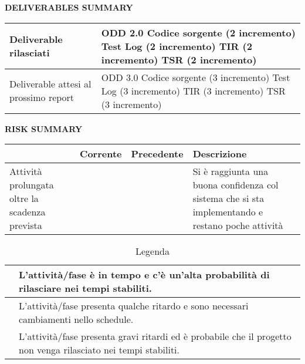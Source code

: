 \begin{center} \textbf{DELIVERABLES SUMMARY} \end{center}
\begin{table}[ht]
\centering
\begin{tabular}{|g|p{8cm}|}
  \hline
  Deliverable rilasciati				& \footnotesize ODD 2.0\newline
							Codice sorgente (2 incremento)\newline
							Test Log (2 incremento)\newline
							TIR (2 incremento)\newline
							TSR (2 incremento)\\
  \hline
  Deliverable attesi al prossimo report 		& \footnotesize ODD 3.0\newline
							Codice sorgente (3 incremento)\newline
							Test Log (3 incremento)\newline
							TIR (3 incremento)\newline
							TSR (3 incremento)\\
  \hline
\end{tabular}
\end{table}
\newpage

\begin{center} \textbf{RISK SUMMARY} \end{center}
\begin{table}[ht]
\centering
\begin{tabular}{|p{3cm}|p{2cm}|p{2cm}|p{5cm}|}
  \hline
  \rowcolor{Gray}	& Corrente		& Precedente		& Descrizione\\
  \hline
  \footnotesize Attività prolungata oltre la scadenza prevista	& \cellcolor{green}	& \cellcolor{yellow}			& \footnotesize Si è raggiunta una buona confidenza col sistema che si sta implementando e restano poche attività\\
  
  \hline
\end{tabular}
\end{table}

\begin{table}[b]
 \centering
 \begin{tabular}{|p{3cm}|p{10cm}|}
  \hline
  \cellcolor{green}			& L'attività/fase è in tempo e c'è un'alta probabilità di rilasciare nei tempi stabiliti.\\
  \hline
  \cellcolor{yellow}			& L'attività/fase presenta qualche ritardo e sono necessari cambiamenti nello schedule.\\
  \hline
  \cellcolor{red}			& L'attività/fase presenta gravi ritardi ed è probabile che il progetto non venga rilasciato nei tempi stabiliti.\\
  \hline
 \end{tabular}
 \caption{Legenda}
\end{table}

